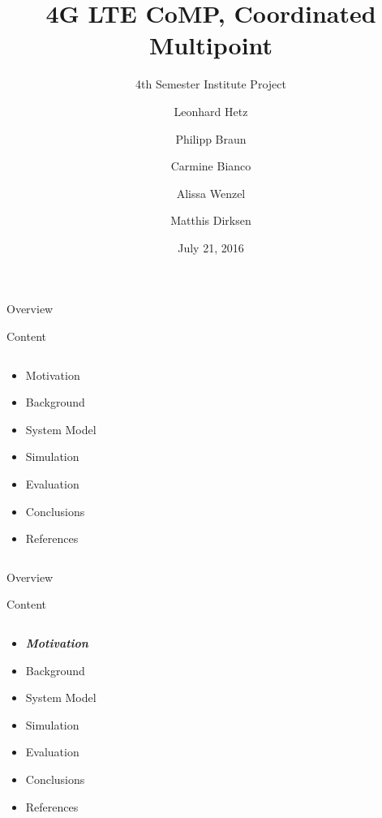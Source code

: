 \documentclass[xcolor={cmyk}]{beamer}
\title{4G LTE CoMP, Coordinated Multipoint}
\subtitle{4th Semester Institute Project}
\author[Matthis Dirksen]{\tiny Leonhard Hetz \and Philipp Braun \and Carmine Bianco \and Alissa Wenzel \and Matthis Dirksen}
\date{July 21, 2016}
\begin{document}
\frame[plain]{\titlepage}

\begin{frame}{Overview}
	\begin{block}{Content}
		\begin{columns}
			\begin{column}{.9\textwidth}
				\begin{itemize}
					\item Motivation
					\item Background
					\item System Model
					\item Simulation
					\item Evaluation
					\item Conclusions
					\item References
				\end{itemize}
			\end{column}
		\end{columns}
	\end{block}
\end{frame}

\begin{frame}{Overview}
	\begin{block}{Content}
		\begin{columns}
			\begin{column}{.9\textwidth}
				\begin{itemize}
					\item \textbf{\emph{Motivation}}
					\item Background
					\item System Model
					\item Simulation
					\item Evaluation
					\item Conclusions
					\item References
				\end{itemize}
			\end{column}
		\end{columns}
	\end{block}
\end{frame}
\end{document}
